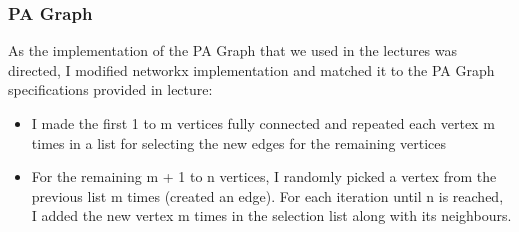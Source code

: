 \documentclass[11pt,a4paper,notitlepage]{article}
\begin{document}
\subsubsection*{PA Graph}
As the implementation of the PA Graph that we used in the lectures was directed, I modified networkx implementation and matched it to the PA Graph specifications provided in lecture:
\begin{itemize}
    \item I made the first 1 to m vertices fully connected and repeated each vertex m times in a list for selecting the new edges for the remaining vertices
    \item For the remaining m + 1 to n vertices, I randomly picked a vertex from the previous list m times (created an edge). For each iteration until n is reached, I added the new vertex m times in the selection list along with its neighbours.
\end{itemize} 
\end{document}
